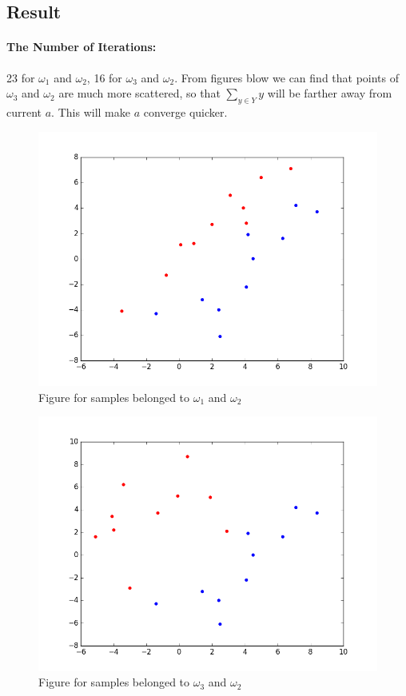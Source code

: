 \documentclass[]{article}
\begin{document}
    \subsection{Result}
    \paragraph{The Number of Iterations:} 23 for $\omega_1$ and $\omega_2$, 16 for $\omega_3$ and $\omega_2$. From figures blow we can find that points of $\omega_3$ and $\omega_2$ are much more scattered, so that $\sum_{y \in Y} y$  will be farther away from current $a$. This will make $a$ converge quicker. 
    \begin{figure}[H]
        \centering
        \includegraphics[scale=0.4]{1_1_2.png}
        \caption{Figure for samples belonged to $\omega_1$ and $\omega_2$}
    \end{figure}
    \begin{figure}[H]
        \centering
        \includegraphics[scale=0.4]{1_3_2.png}
        \caption{Figure for samples belonged to $\omega_3$ and $\omega_2$}
    \end{figure}
\end{document}
